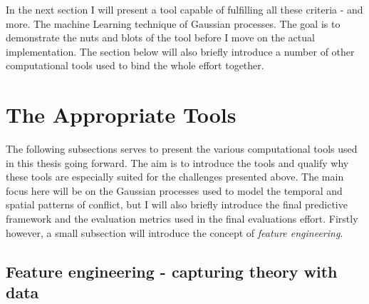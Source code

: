 \documentclass[a4paper]{article}
\begin{document}
In the next section I will present a tool capable of fulfilling all these criteria - and more. The machine Learning technique of Gaussian processes. The goal is to demonstrate the nuts and blots of the tool before I move on the actual implementation. The section below will also briefly introduce a number of other computational tools used to bind the whole effort together.\par


\section{The Appropriate Tools}\label{tools}

The following subsections serves to present the various computational tools used in this thesis going forward. The aim is to introduce the tools and qualify why these tools are especially suited for the challenges presented above. The main focus here will be on the Gaussian processes used to model the temporal and spatial patterns of conflict, but I will also briefly introduce the final predictive framework and the evaluation metrics used in the final evaluations effort. Firstly however, a small subsection will introduce the concept of \emph{feature engineering}.\par




\subsection{Feature engineering - capturing theory with data} %
\end{document}
